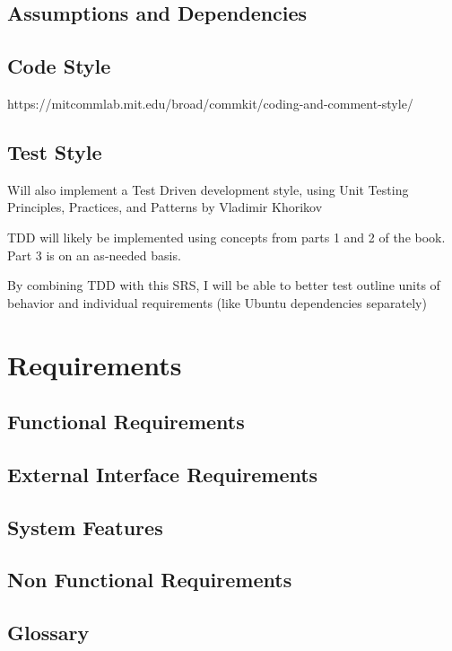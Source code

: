 \section{Assumptions and Dependencies}

\section{Code Style}
https://mitcommlab.mit.edu/broad/commkit/coding-and-comment-style/


\section{Test Style}

Will also implement a Test Driven development style, using Unit Testing Principles, Practices, and Patterns by Vladimir Khorikov

TDD will likely be implemented using concepts from parts 1 and 2 of the book. Part 3 is on an as-needed basis.

By combining TDD with this SRS, I will be able to better test outline units of behavior and individual requirements (like Ubuntu dependencies separately)



\newpage




\chapter{Requirements}
\label{Requirements}

\section{Functional Requirements}
\section{External Interface Requirements}
\section{System Features}
\section{Non Functional Requirements}





\begin{appendices}
\chapter{Glossary}


\end{appendices}


